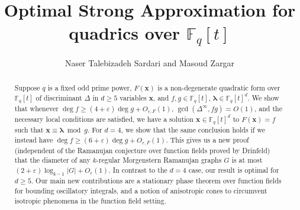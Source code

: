 \documentclass[10pt]{amsart}
\theoremstyle{plain}
\theoremstyle{plain}
\renewcommand{\vec}[1]{\mathbf{#1}}
\theoremstyle{remark}
\theoremstyle{definition}
\renewcommand{\contentsname}{}
\begin{document}
\title{Optimal Strong Approximation for quadrics over $\mathbb{F}_q[t]$}
\author{Naser Talebizadeh  Sardari and Masoud Zargar}


\address{Penn State department of Mathematics, McAllister Building, Pollock Rd, State College, PA 16802 USA}

\address{Department of Mathematics, University of Southern California, 3620 S. Vermont
Ave., Los Angeles, CA 90089-2532, U.S.A.}


\renewcommand{\contentsname}{}

\begin{abstract}
Suppose $q$ is a fixed odd prime power, $F(\vec{x})$ is a non-degenerate quadratic form over $\mathbb{F}_q[t]$ of discriminant $\Delta$ in $d\geq 5$ variables $\vec{x}$, and $f,g\in\mathbb{F}_q[t]$, $\boldsymbol{\lambda}\in\mathbb{F}_q[t]^d$. We show that whenever $\deg f\geq (4+\varepsilon)\deg g+O_{\varepsilon,F}(1)$, $\gcd(\Delta^{\infty},fg)=O(1)$, and the necessary local conditions are satisfied, we have a solution $\vec{x}\in\mathbb{F}_q[t]^d$ to $F(\vec{x})=f$ such that $\vec{x}\equiv\boldsymbol{\lambda}\bmod g$. For $d=4$, we show that the same conclusion holds if we instead have $\deg f\geq (6+\varepsilon)\deg g+O_{\varepsilon,F}(1)$. This gives us a new proof (independent of the Ramanujan conjecture over function fields proved by Drinfeld) that the diameter of any $k$-regular Morgenstern Ramanujan graphs $G$ is at most $(2+\varepsilon)\log_{k-1}|G|+O_{\varepsilon}(1)$.  In contrast to the $d=4$ case, our result is optimal for $d\geq 5$. Our main new contributions are a stationary phase theorem over function fields for bounding oscillatory integrals, and a notion of anisotropic cones to circumvent isotropic phenomena in the function field setting.\footnotetext{\date\today}
\end{abstract}
\maketitle
\setcounter{tocdepth}{1}
\tableofcontents
\end{document}
